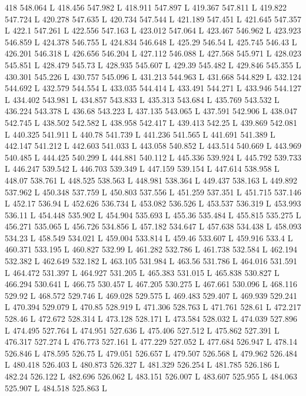 418 548.064 L
418.456 547.982 L
418.911 547.897 L
419.367 547.811 L
419.822 547.724 L
420.278 547.635 L
420.734 547.544 L
421.189 547.451 L
421.645 547.357 L
422.1 547.261 L
422.556 547.163 L
423.012 547.064 L
423.467 546.962 L
423.923 546.859 L
424.378 546.755 L
424.834 546.648 L
425.29 546.54 L
425.745 546.43 L
426.201 546.318 L
426.656 546.204 L
427.112 546.088 L
427.568 545.971 L
428.023 545.851 L
428.479 545.73 L
428.935 545.607 L
429.39 545.482 L
429.846 545.355 L
430.301 545.226 L
430.757 545.096 L
431.213 544.963 L
431.668 544.829 L
432.124 544.692 L
432.579 544.554 L
433.035 544.414 L
433.491 544.271 L
433.946 544.127 L
434.402 543.981 L
434.857 543.833 L
435.313 543.684 L
435.769 543.532 L
436.224 543.378 L
436.68 543.223 L
437.135 543.065 L
437.591 542.906 L
438.047 542.745 L
438.502 542.582 L
438.958 542.417 L
439.413 542.25 L
439.869 542.081 L
440.325 541.911 L
440.78 541.739 L
441.236 541.565 L
441.691 541.389 L
442.147 541.212 L
442.603 541.033 L
443.058 540.852 L
443.514 540.669 L
443.969 540.485 L
444.425 540.299 L
444.881 540.112 L
445.336 539.924 L
445.792 539.733 L
446.247 539.542 L
446.703 539.349 L
447.159 539.154 L
447.614 538.958 L
448.07 538.761 L
448.525 538.563 L
448.981 538.364 L
449.437 538.163 L
449.892 537.962 L
450.348 537.759 L
450.803 537.556 L
451.259 537.351 L
451.715 537.146 L
452.17 536.94 L
452.626 536.734 L
453.082 536.526 L
453.537 536.319 L
453.993 536.11 L
454.448 535.902 L
454.904 535.693 L
455.36 535.484 L
455.815 535.275 L
456.271 535.065 L
456.726 534.856 L
457.182 534.647 L
457.638 534.438 L
458.093 534.23 L
458.549 534.021 L
459.004 533.814 L
459.46 533.607 L
459.916 533.4 L
460.371 533.195 L
460.827 532.99 L
461.282 532.786 L
461.738 532.584 L
462.194 532.382 L
462.649 532.182 L
463.105 531.984 L
463.56 531.786 L
464.016 531.591 L
464.472 531.397 L
464.927 531.205 L
465.383 531.015 L
465.838 530.827 L
466.294 530.641 L
466.75 530.457 L
467.205 530.275 L
467.661 530.096 L
468.116 529.92 L
468.572 529.746 L
469.028 529.575 L
469.483 529.407 L
469.939 529.241 L
470.394 529.079 L
470.85 528.919 L
471.306 528.763 L
471.761 528.61 L
472.217 528.46 L
472.672 528.314 L
473.128 528.171 L
473.584 528.032 L
474.039 527.896 L
474.495 527.764 L
474.951 527.636 L
475.406 527.512 L
475.862 527.391 L
476.317 527.274 L
476.773 527.161 L
477.229 527.052 L
477.684 526.947 L
478.14 526.846 L
478.595 526.75 L
479.051 526.657 L
479.507 526.568 L
479.962 526.484 L
480.418 526.403 L
480.873 526.327 L
481.329 526.254 L
481.785 526.186 L
482.24 526.122 L
482.696 526.062 L
483.151 526.007 L
483.607 525.955 L
484.063 525.907 L
484.518 525.863 L
